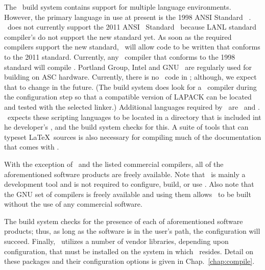 The \draco\ build system contains support for multiple language
environments.  However, the primary language in use at present is the 1998 ANSI
Standard \cpp~\cite{ansi:cpp}.  \draco\ does not currently support the 2011 ANSI \cpp\ Standard~\cite{ansi:cpp11} because LANL standard compiler's do not support the new standard yet.  As soon as the required compilers support the new standard, \draco\ will allow code to be written that conforms to the 2011 standard. Currently, any \cpp\ compiler that conforms to the 1998 standard will compile \draco.  Portland Group, Intel and GNU \cpp\ are regularly used for building on ASC hardware. 
Currently, there
is no \fortran\ code in \draco; although, we expect that to change in
the future.  (The build system does look for a \fortran\ compiler during the configuration step so that a compatible version of LAPACK can be located and tested with the selected linker.)
Additional languages required by \draco\ are \python\ and 
.  \draco\ expects these scripting
languages to be located in a directory that is included int he developer's ,
and the build system checks for this.   A suite of tools that can typeset \LaTeX\ sources is also
necessary for compiling much of the documentation that comes with \draco.
  

With the exception of \bullseye\ and the listed commercial compilers, all of the
aforementioned software products are freely available.  Note that \bullseye\ is mainly a
development tool and is not required to configure, build, or use
\draco.  Also note that the GNU set of compilers is freely available and using them allows \draco\ to be built without the use of any commercial software.

The build system checks for the presence of each of aforementioned software products; thus, as
long as the software is in the user's path, the configuration will
succeed.  Finally, \draco\ utilizes a number of vendor libraries,
depending upon configuration, that must be installed on the system in
which \draco\ resides.  Detail on these packages and their
configuration options is given in Chap.~\ref{chap:compile}.

